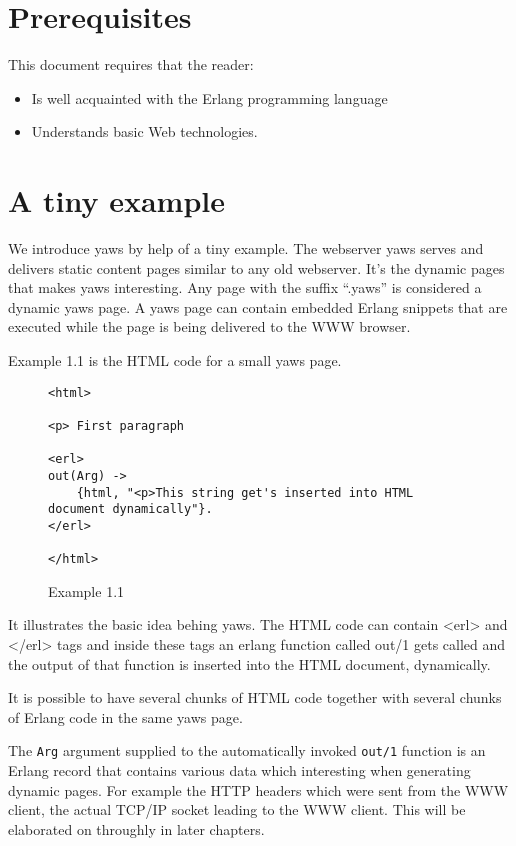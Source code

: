 \documentclass[11pt,oneside,english]{book}
\begin{document}
\section{Prerequisites}
This document requires that the reader:
\begin{itemize}
\item Is well acquainted with the Erlang programming language
\item Understands basic Web technologies.
\end{itemize}


\section{A tiny example}

We introduce yaws by help of a tiny example. 
 The webserver yaws serves  and delivers
static content pages similar to any old webserver. It's the dynamic pages
that makes yaws interesting. Any page with the suffix ``.yaws'' is considered
a dynamic yaws page. A yaws page can contain embedded Erlang snippets that
are executed while the page is being delivered to the WWW browser.

Example 1.1 is the HTML code for a small yaws page.


\begin{figure}[h]
\begin{verbatim}
<html>

<p> First paragraph

<erl>
out(Arg) ->
    {html, "<p>This string get's inserted into HTML document dynamically"}.
</erl>

</html>
\end{verbatim}
\caption{Example 1.1}
\end{figure}

It illustrates the basic idea behing yaws. The HTML code
can contain <erl> and </erl> tags and inside these tags an erlang function
called out/1 gets called and the output of that function is inserted
into the HTML document, dynamically. 

It is possible to have several chunks of HTML code together with several 
chunks of Erlang code in the same yaws page.

The \verb+Arg+ argument supplied to the automatically invoked \verb+out/1+
function is an Erlang record that contains various data which interesting 
when generating dynamic pages. For example the HTTP headers which were sent
from the WWW client, the actual TCP/IP socket leading to the WWW client.
This will be elaborated on throughly in later chapters. 
\end{document}

